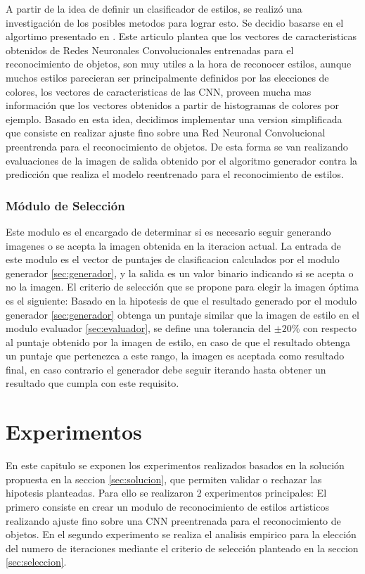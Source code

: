 \documentclass[a4paper,11pt,spanish]{book}
\begin{document}
      A partir de la idea de definir un clasificador de estilos, se realizó una investigación de los posibles metodos para lograr esto. Se decidio basarse en el algortimo presentado en \cite{Karayev:Style_Recognition}.
      Este articulo plantea que los vectores de caracteristicas obtenidos de Redes Neuronales Convolucionales entrenadas para el reconocimiento de objetos, son muy utiles a la hora de
      reconocer estilos, aunque muchos estilos parecieran ser principalmente definidos por las elecciones de colores, los vectores de caracteristicas de las CNN, proveen mucha mas información
      que los vectores obtenidos a partir de histogramas de colores por ejemplo.
      Basado en esta idea, decidimos implementar una version simplificada que consiste en realizar ajuste fino sobre una Red Neuronal Convolucional preentrenda para el reconocimiento de objetos.
      De esta forma se van realizando evaluaciones de la imagen de salida obtenido por el algoritmo generador contra la predicción que realiza el modelo reentrenado para el reconocimiento de estilos.

    \subsection{Módulo de Selección \label{sec:seleccion}}
      Este modulo es el encargado de determinar si es necesario seguir generando imagenes o se acepta la imagen obtenida en la iteracion actual. La entrada de este modulo
      es el vector de puntajes de clasificacion calculados por el modulo generador \ref{sec:generador}, y la salida es un valor binario indicando si se acepta o no la imagen.
      El criterio de selección que se propone para elegir la imagen óptima es el siguiente:
      Basado en la hipotesis de que el resultado generado por el modulo generador \ref{sec:generador} obtenga un puntaje similar que la imagen de estilo en el modulo evaluador
      \ref{sec:evaluador}, se define una tolerancia del $\pm 20\%$ con respecto al puntaje obtenido por la imagen de estilo, en caso de que el resultado obtenga un puntaje que pertenezca
      a este rango, la imagen es aceptada como resultado final, en caso contrario el generador debe seguir iterando hasta obtener un resultado que cumpla con este requisito.


\chapter{Experimentos}
 En este capitulo se exponen los experimentos realizados basados en la solución propuesta en la seccion \ref{sec:solucion}, que permiten validar o rechazar las hipotesis planteadas.
 Para ello se realizaron 2 experimentos principales: El primero consiste en crear un modulo de reconocimiento de estilos artisticos realizando ajuste fino sobre una CNN preentrenada
 para el reconocimiento de objetos. En el segundo experimento se realiza el analisis empirico para la elección del numero de iteraciones mediante el criterio de selección planteado en la
 seccion \ref{sec:seleccion}.
\end{document}
